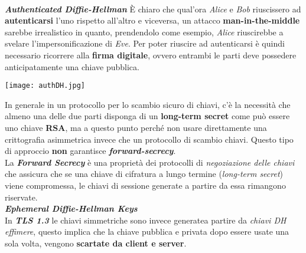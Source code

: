 \\ \newline
\textbf{\textit{Authenticated Diffie-Hellman}}
\newline
È chiaro che qual'ora \textit{Alice} e \textit{Bob} riuscissero ad \textbf{autenticarsi} l'uno rispetto all'altro e viceversa, un attacco \textbf{man-in-the-middle} sarebbe irrealistico in quanto, prendendolo come esempio, \textit{Alice} riuscirebbe a svelare l'impersonificazione di \textit{Eve}. Per poter riuscire ad autenticarsi è quindi necessario ricorrere alla \textbf{firma digitale}, ovvero entrambi le parti deve possedere anticipatamente una chiave pubblica. 
\begin{center}
    \texttt{[image: authDH.jpg]}
\end{center}
In generale in un protocollo per lo scambio sicuro di chiavi, c'è la necessità che almeno una delle due parti disponga di un \textbf{long-term secret} come può essere uno chiave \textbf{RSA}, ma a questo punto perché non usare direttamente una crittografia asimmetrica invece che un protocollo di scambio chiavi. Questo tipo di approccio \textbf{non} garantisce \textbf{\textit{forward-secrecy}}. \\
La \textbf{\textit{Forward Secrecy}} è una proprietà dei protocolli di \textit{negoziazione delle chiavi} che assicura che se una chiave di cifratura a lungo termine (\textit{long-term secret}) viene compromessa, le chiavi di sessione generate a partire da essa rimangono riservate. \\ \newline
\textbf{\textit{Ephemeral Diffie-Hellman Keys}} \\
In \textbf{\textit{TLS 1.3}} le chiavi simmetriche sono invece generatea partire da \textit{chiavi DH effimere}, questo implica che la chiave pubblica e privata dopo essere usate una sola volta, vengono \textbf{scartate da client e server}.

\newpage

